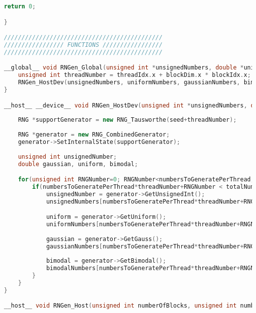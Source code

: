 \begin{lstlisting}[language=C++, caption={\texttt{libraries/CoreLibraries/RandomGenerator/OutputTest.cu}}]
	return 0;

}

/////////////////////////////////////////////
///////////////// FUNCTIONS /////////////////
/////////////////////////////////////////////

__global__ void RNGen_Global(unsigned int *unsignedNumbers, double *uniformNumbers, double *gaussianNumbers, double *bimodalNumbers, unsigned int totalNumbersToGenerate, unsigned int numbersToGeneratePerThread, unsigned int seed){
	unsigned int threadNumber = threadIdx.x + blockDim.x * blockIdx.x;
	RNGen_HostDev(unsignedNumbers, uniformNumbers, gaussianNumbers, bimodalNumbers, totalNumbersToGenerate, numbersToGeneratePerThread, seed, threadNumber);
}

__host__ __device__ void RNGen_HostDev(unsigned int *unsignedNumbers, double *uniformNumbers, double *gaussianNumbers, double *bimodalNumbers, unsigned int totalNumbersToGenerate, unsigned int numbersToGeneratePerThread, unsigned int seed, unsigned int threadNumber){
	
	RNG *supportGenerator = new RNG_Tausworthe(seed+threadNumber);
	
	RNG *generator = new RNG_CombinedGenerator;
	generator->SetInternalState(supportGenerator);
	
	unsigned int unsignedNumber;
	double gaussian, uniform, bimodal;

	for(unsigned int RNGNumber=0; RNGNumber<numbersToGeneratePerThread; ++RNGNumber){		
		if(numbersToGeneratePerThread*threadNumber+RNGNumber < totalNumbersToGenerate){
			unsignedNumber = generator->GetUnsignedInt();
			unsignedNumbers[numbersToGeneratePerThread*threadNumber+RNGNumber] = unsignedNumber;

			uniform = generator->GetUniform();
			uniformNumbers[numbersToGeneratePerThread*threadNumber+RNGNumber] = uniform;
		
			gaussian = generator->GetGauss();
			gaussianNumbers[numbersToGeneratePerThread*threadNumber+RNGNumber] = gaussian;
			
			bimodal = generator->GetBimodal();
			bimodalNumbers[numbersToGeneratePerThread*threadNumber+RNGNumber] = bimodal;
		}
	}
}

__host__ void RNGen_Host(unsigned int numberOfBlocks, unsigned int numberOfThreadsPerBlock, unsigned int *unsignedNumbers, double *uniformNumbers, double *gaussianNumbers, double *bimodalNumbers, unsigned int totalNumbersToGenerate, unsigned int numbersToGeneratePerThread, unsigned int seed){
	

\end{lstlisting}

